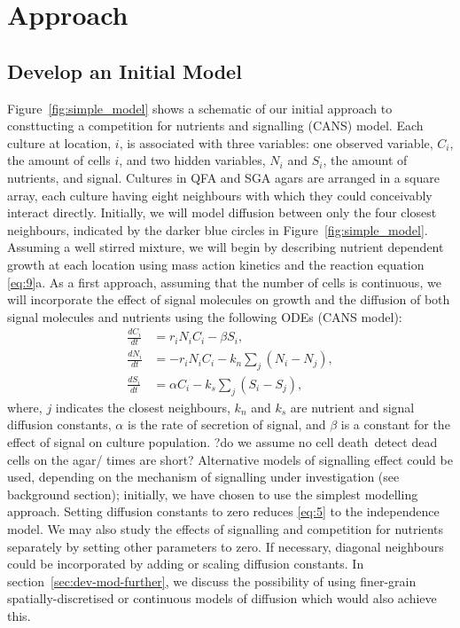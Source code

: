 \graphicspath{{images_low_res/}}
\section{Approach}
\label{sec:approach}

\subsection{Develop an Initial Model}
\label{sec:initial_model}

Figure~\ref{fig:simple_model} shows a schematic of our initial
approach to consttucting a competition for nutrients and signalling
(CANS) model. Each culture at location, \(i\), is associated with
three variables: one observed variable, \(C_{i}\), the amount of cells
\(i\), and two hidden variables, \(N_{i}\) and \(S_{i}\), the amount
of nutrients, and signal. Cultures in QFA and SGA agars are arranged
in a square array, each culture having eight neighbours with which
they could conceivably interact directly. Initially, we will model
diffusion between only the four closest neighbours, indicated by the
darker blue circles in Figure~\ref{fig:simple_model}. Assuming a well
stirred mixture, we will begin by describing nutrient dependent growth
at each location using mass action kinetics and the reaction equation
\ref{eq:9}a.
As a first approach, assuming that the number of cells is continuous,
we will incorporate the effect of signal molecules on growth and the
diffusion of both signal molecules and nutrients using the following
ODEs (CANS model):
\begin{subequations}
  \label{eq:5}
  \begin{align}
    \frac{dC_{i}}{dt}& = r_{i}N_{i}C_{i} - \beta S_{i},\\
    \frac{dN_{i}}{dt}& = - r_{i}N_{i}C_{i} - k_{n}\sum_{j}(N_{i} - N_{j}),\\
    \frac{dS_{i}}{dt}& = \alpha C_{i} - k_{s}\sum_{j}(S_{i} - S_{j}),
  \end{align}
\end{subequations}
where, \(j\) indicates the closest neighbours, \(k_{n}\) and \(k_{s}\)
are nutrient and signal diffusion constants, \(\alpha\) is the rate of
secretion of signal, and \(\beta\) is a constant for the effect of
signal on culture population. ?do we assume no cell death\ detect dead
cells on the agar/ times are short? Alternative models of signalling
effect could be used, depending on the mechanism of signalling under
investigation (see background section); initially, we have chosen to
use the simplest modelling approach. Setting diffusion constants to
zero reduces \ref{eq:5} to the independence model. We may also study
the effects of signalling and competition for nutrients separately by
setting other parameters to zero. If necessary, diagonal neighbours
could be incorporated by adding or scaling diffusion constants. In
section~\ref{sec:dev-mod-further}, we discuss the possibility of using
finer-grain spatially-discretised or continuous models of diffusion
which would also achieve this.

